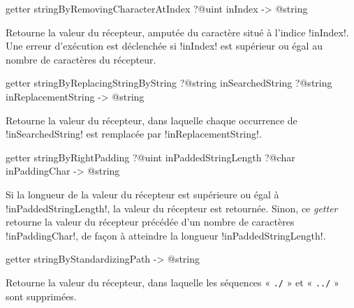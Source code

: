 
\begin{galgasbox}
getter stringByRemovingCharacterAtIndex ?@uint inIndex -> @string
\end{galgasbox}

Retourne la valeur du récepteur, amputée du caractère situé à l'indice \ggs!inIndex!. Une erreur d'exécution est déclenchée si \ggs!inIndex! est supérieur ou égal au nombre de caractères du récepteur.








\begin{galgasbox}
getter stringByReplacingStringByString
     ?@string inSearchedString
     ?@string inReplacementString  -> @string
\end{galgasbox}

Retourne la valeur du récepteur, dans laquelle chaque occurrence de \ggs!inSearchedString! est remplacée par \ggs!inReplacementString!.








\begin{galgasbox}
getter stringByRightPadding
   ?@uint inPaddedStringLength
   ?@char inPaddingChar -> @string
\end{galgasbox}

Si la longueur de la valeur du récepteur est supérieure ou égal à \ggs!inPaddedStringLength!, la valeur du récepteur est retournée. Sinon, ce \emph{getter} retourne la valeur du récepteur précédée d'un nombre de caractères \ggs!inPaddingChar!, de façon à atteindre la longueur \ggs!inPaddedStringLength!.





\begin{galgasbox}
getter stringByStandardizingPath -> @string
\end{galgasbox}

Retourne la valeur du récepteur, dans laquelle les séquences « \texttt{./} » et « \texttt{../} » sont supprimées.







